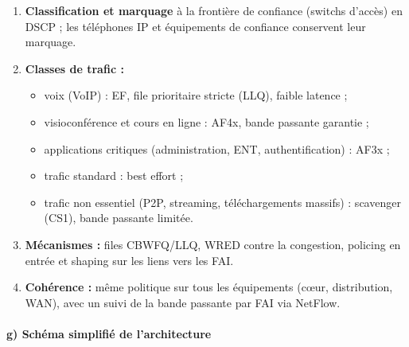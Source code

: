 \documentclass[12pt,a4paper]{article}
\begin{document}
\begin{enumerate}
    \item \textbf{Classification et marquage} à la frontière de
    confiance (switchs d'accès) en DSCP ; les téléphones IP et
    équipements de confiance conservent leur marquage.
    \item \textbf{Classes de trafic :}
    \begin{itemize}
        \item voix (VoIP) : EF, file prioritaire stricte (LLQ), faible
        latence ;
        \item visioconférence et cours en ligne : AF4x, bande passante
        garantie ;
        \item applications critiques (administration, ENT,
        authentification) : AF3x ;
        \item trafic standard : best effort ;
        \item trafic non essentiel (P2P, streaming, téléchargements
        massifs) : scavenger (CS1), bande passante limitée.
    \end{itemize}
    \item \textbf{Mécanismes :} files CBWFQ/LLQ, WRED contre la
    congestion, policing en entrée et shaping sur les liens vers les FAI.
    \item \textbf{Cohérence :} même politique sur tous les équipements
    (cœur, distribution, WAN), avec un suivi de la bande passante par FAI
    via NetFlow.
\end{enumerate}

\paragraph{g) Schéma simplifié de l'architecture}
\end{document}
